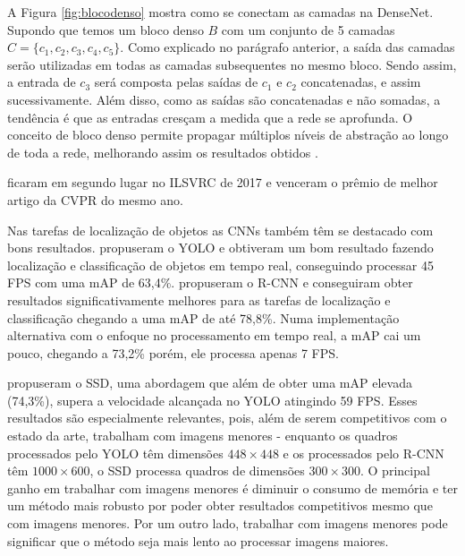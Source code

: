 A Figura \ref{fig:blocodenso} mostra como se conectam as camadas na \ac{DenseNet}. Supondo que temos um bloco denso $B$ com um conjunto de 5 camadas $C = \{c_1, c_2, c_3, c_4, c_5\}$. Como explicado no parágrafo anterior, a saída das camadas serão utilizadas em todas as camadas subsequentes no mesmo bloco. Sendo assim, a entrada de $c_3$ será composta pelas saídas de $c_1$ e $c_2$ concatenadas, e assim sucessivamente. Além disso, como as saídas são concatenadas e não somadas, a tendência é que as entradas cresçam a medida que a rede se aprofunda. O conceito de bloco denso permite propagar múltiplos níveis de abstração ao longo de toda a rede, melhorando assim os resultados obtidos \cite{liu-2017}.

\citeauthor{liu-2017} ficaram em segundo lugar no \ac{ILSVRC} de 2017 e venceram o prêmio de melhor artigo da \ac{CVPR} do mesmo ano.

Nas tarefas de localização de objetos as \ac{CNN}s também têm se destacado com bons resultados.  propuseram o \ac{YOLO} e obtiveram um bom resultado fazendo localização e classificação de objetos em tempo real, conseguindo processar 45 \ac{FPS} com uma \ac{mAP} de 63,4\%.  propuseram o \ac{R-CNN} e conseguiram obter resultados significativamente melhores para as tarefas de localização e classificação chegando a uma \ac{mAP} de até 78,8\%. Numa implementação alternativa com o enfoque no processamento em tempo real, a \ac{mAP} cai um pouco, chegando a 73,2\% porém, ele processa apenas 7 \ac{FPS}.

 propuseram o \ac{SSD}, uma abordagem que além de obter uma \ac{mAP} elevada (74,3\%), supera a velocidade alcançada no \ac{YOLO} atingindo 59 \ac{FPS}. Esses resultados são especialmente relevantes, pois, além de serem competitivos com o estado da arte, trabalham com imagens menores - enquanto os quadros processados pelo \ac{YOLO} têm dimensões $448 \times 448$ e os processados pelo \ac{R-CNN} têm $1000\times 600$, o \ac{SSD} processa quadros de dimensões $300 \times 300$. O principal ganho em trabalhar com imagens menores é diminuir o consumo de memória e ter um método mais robusto por poder obter resultados competitivos mesmo que com imagens menores. Por um outro lado, trabalhar com imagens menores pode significar que o método seja mais lento ao processar imagens maiores.

